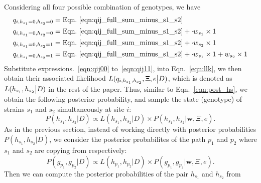 \documentclass{bioinfo}
\begin{document}
Considering all four possible combination of genotypes, we have
\begin{align}
q_{i,h_{s_1}=0,h_{s_2}=0} & = \textrm{Eqn.~\eqref{eqn:qij_full_sum_minus_s1_s2}} \label{eqn:qij00}\\
q_{i,h_{s_1}=0,h_{s_2}=0} & = \textrm{Eqn.~\eqref{eqn:qij_full_sum_minus_s1_s2}} + \cdot w_{s_1} \times 1 \label{eqn:qij10}\\
q_{i,h_{s_1}=0,h_{s_2}=1} & = \textrm{Eqn.~\eqref{eqn:qij_full_sum_minus_s1_s2}} + \cdot w_{s_2} \times 1 \label{eqn:qij01}\\
q_{i,h_{s_1}=0,h_{s_2}=1} & = \textrm{Eqn.~\eqref{eqn:qij_full_sum_minus_s1_s2}} + \cdot w_{s_1} \times 1 + w_{s_2} \times 1 \label{eqn:qij11}
\end{align}
Substitute expressions.~\eqref{eqn:qij00} to~\eqref{eqn:qij11}, into Eqn.~\eqref{eqn:llk}, we then obtain their associated likelihood $L(q_{i,h_{s_1},h_{s_2}} , \Xi, e \big{|} D)$, which is denoted as $L(h_{s_1},h_{s_2} \big{|} D)$ in the rest of the paper.
Thus, similar to Eqn.~\eqref{eqn:post_hs}, we obtain the following posterior probability, and sample the state (genotype) of strains $s_1$ and $s_2$ simultaneously at site $i$:
\begin{equation}
P(h_{s_1},h_{s_2} | D) \propto L(h_{s_1},h_{s_2} |D) \times P(h_{s_1},h_{s_2} | \mathbf{w}, \Xi, e).\label{eqn:post.two:LD}
\end{equation}
As in the previous section, instead of working directly with posterior probabilities $P(h_{s_1},h_{s_2} | D)$, we consider the posterior probabilites of the path $p_1$ and $p_2$ where $s_1$ and $s_2$ are copying from respectively:
\begin{equation}
P(g_{p_1}, g_{p_2}|D ) \propto L(h_{p_1},h_{p_2} |D) \times P(g_{p_1}, g_{p_2}|\mathbf{w}, \Xi, e).\label{eqn:post.two.LD}
\end{equation}
Then we can compute the posterior probabilities of the pair $h_{s_1}$ and $h_{s_2}$ from
\end{document}
